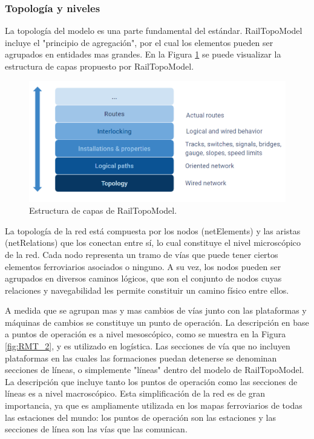 \subsubsection{Topología y niveles}

    La topología del modelo es una parte fundamental del estándar. RailTopoModel incluye el "principio de agregación", por el cual los elementos pueden ser agrupados en entidades mas grandes. En la Figura \ref{fig:RTM_1} se puede visualizar la estructura de capas propuesto por RailTopoModel.

    \begin{figure}[!h]
        \centering
        \includegraphics[width=1\textwidth]{Figuras/capas}
        \centering\caption{Estructura de capas de RailTopoModel.}
        \label{fig:RTM_1}
    \end{figure}
    
    La topología de la red está compuesta por los nodos (netElements) y las aristas (netRelations) que los conectan entre sí, lo cual constituye el nivel microscópico de la red. Cada nodo representa un tramo de vías que puede tener ciertos elementos ferroviarios asociados o ninguno. A su vez, los nodos pueden ser agrupados en diversos caminos lógicos, que son el conjunto de nodos cuyas relaciones y navegabilidad les permite constituir un camino físico entre ellos.

    A medida que se agrupan mas y mas cambios de vías junto con las plataformas y máquinas de cambios se constituye un punto de operación. La descripción en base a puntos de operación es a nivel mesoscópico, como se muestra en la Figura \ref{fig:RMT_2}, y es utilizado en logística. Las secciones de vía que no incluyen plataformas en las cuales las formaciones puedan detenerse se denominan secciones de líneas, o simplemente "líneas" dentro del modelo de RailTopoModel. La descripción que incluye tanto los puntos de operación como las secciones de líneas es a nivel macroscópico. Esta simplificación de la red es de gran importancia, ya que es ampliamente utilizada en los mapas ferroviarios de todas las estaciones del mundo: los puntos de operación son las estaciones y las secciones de línea son las vías que las comunican. 
    
